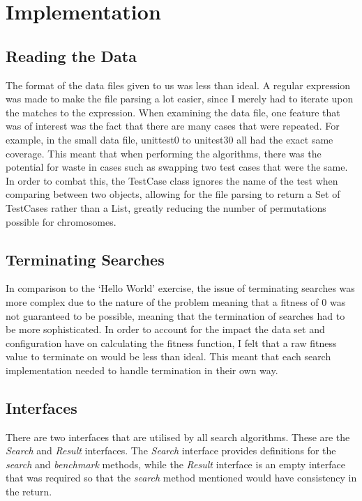 \documentclass[11pt, a4paper]{article}
\begin{document}
\section{Implementation}
\label{sec:implementation}
\subsection{Reading the Data}
\label{sub:reading_data}
The format of the data files given to us was less than ideal. A regular
expression was made to make the file parsing a lot easier, since I merely had to
iterate upon the matches to the expression. When examining the data file, one
feature that was of interest was the fact that there are many cases that were
repeated. For example, in the small data file, unittest0 to unitest30 all had
the exact same coverage. This meant that when performing the algorithms, there
was the potential for waste in cases such as swapping two test cases that were
the same. In order to combat this, the TestCase class ignores the name of the
test when comparing between two objects, allowing for the file parsing to return
a Set of TestCases rather than a List, greatly reducing the number of
permutations possible for chromosomes.

\subsection{Terminating Searches}
\label{sub:terminating}
In comparison to the `Hello World' exercise, the issue of terminating searches
was more complex due to the nature of the problem meaning that a fitness of 0
was not guaranteed to be possible, meaning that the termination of searches had
to be more sophisticated. In order to account for the impact the data set and
configuration have on calculating the fitness function, I felt that a raw
fitness value to terminate on would be less than ideal. This meant that each
search implementation needed to handle termination in their own way.

\subsection{Interfaces}
\label{sub:interfaces}
There are two interfaces that are utilised by all search algorithms. These are
the \emph{Search} and \emph{Result} interfaces. The \emph{Search} interface
provides definitions for the \emph{search} and \emph{benchmark} methods, while
the \emph{Result} interface is an empty interface that was required so that the
\emph{search} method mentioned would have consistency in the return.
\end{document}
